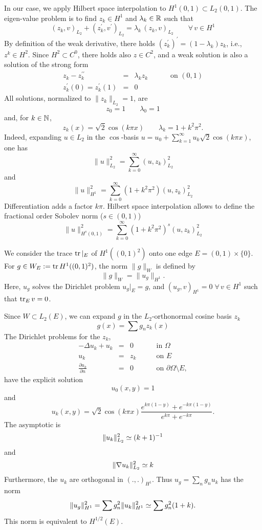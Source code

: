 In our case, we apply Hilbert space interpolation to $H^1(0,1) \subset L_2(0,1)$. The eigen-value problem is to find $z_k \in H^1$ and $\lambda_k \in {\mathbb R}$
such that
$$
(z_k, v)_{L_2} + (z_k^\prime, v^\prime)_{L_2} = \lambda_k \, 
        (z_k, v)_{L_2} \qquad \forall \, v \in H^1
$$
By definition of the weak derivative, there holds $(z_k^\prime)^\prime = (1-\lambda_k) z_k$, i.e., $z^k \in H^2$. Since $H^2 \subset C^0$, there holds also
$z \in C^2$, and a weak solution is also a solution of the strong form
\begin{equation}
\begin{array}{rcll}
z_k - z_k^{\prime \prime} & = & \lambda_k z_k \qquad & \mbox{ on } (0,1) \\
z_k^\prime(0) = z_k^\prime(1) & = & 0
\end{array}
\end{equation}
All solutions, normalized to $\| z_k \|_{L_2} = 1$, are
$$
z_0 = 1 \qquad \lambda_0 = 1
$$
and, for $k \in {\mathbb N}$,
$$
z_k(x) = \sqrt{2} \cos (k \pi x) \qquad \lambda_k = 1 + k^2 \pi^2.
$$
Indeed, expanding $u \in L_2$ in the $\cos$-basis $u = u_0 + \sum_{k=1}^\infty
u_k \sqrt2 \cos (k \pi x)$, one has
$$
\| u \|_{L_2}^2 = \sum_{k=0}^\infty (u, z_k)_{L_2}^2
$$
and
$$
\| u \|_{H^1}^2 = \sum_{k=0}^\infty (1+k^2 \pi^2) (u, z_k)_{L_2}^2
$$
Differentiation adds a factor $k \pi$.
Hilbert space interpolation allows to define the fractional order Sobolev
norm ($s \in (0,1)$)
$$
\| u \|_{H^s(0,1)}^2 = \sum_{k=0}^\infty (1+k^2 \pi^2)^s (u,z_k)_{L_2}^2
$$




\bigskip
We consider the trace $\operatorname{tr}|_E$ of $H^1((0,1)^2)$ onto one edge $E = (0,1) \times \{ 0 \}$. For $g \in W_E := \operatorname{tr} H^1((0,1)^2)$, the norm $\| g \|_W$ is 
defined by 
$$
\| g \|_W = \| u_g \|_{H^1}.
$$
Here, $u_g$ solves the Dirichlet problem $u_g|_E = g$, and $(u_g,v)_{H^1} = 0 \; \forall \, v \in H^1$ such that $\operatorname{tr}_E v = 0$.

Since $W \subset L_2(E)$, we can expand $g$ in the $L_2$-orthonormal cosine basis $z_k$
$$
g(x) = \sum g_n z_k(x)
$$
The Dirichlet problems for the $z_k$,
$$
\begin{array}{rcll}
-\Delta u_k + u_k & = & 0  \qquad & \mbox{in } \Omega \\
 u_k & = & z_k \qquad & \mbox{on } E \\
\frac{\partial u_k}{\partial n} & = & 0 \qquad & \mbox{on } \partial \Omega \setminus E,
\end{array}
$$
have the explicit solution
$$
u_0(x,y) = 1
$$
and
$$
u_k(x,y) = \sqrt 2 \cos (k \pi x) \frac{e^{k \pi (1-y)} + e^{-k \pi (1-y)}}{e^{k \pi} + e^{-k \pi}}.
$$
The asymptotic is
$$
\| u_k \|_{L_2}^2 \simeq (k+1)^{-1}
$$
and
$$
\| \nabla u_k \|_{L_2}^2 \simeq k 
$$
Furthermore, the $u_k$ are orthogonal in $(.,.)_{H^1}$. Thus $u_g = \sum_n g_n u_k$ has the norm
$$
\| u_g \|_{H^1}^2 = \sum g_n^2 \| u_k \|_{H^1}^2 \simeq \sum g_n^2 (1+k).
$$
This norm is equivalent to $H^{1/2}(E)$. 


